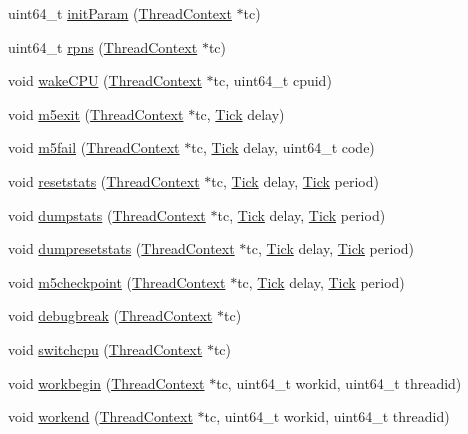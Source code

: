 \begin{DoxyCompactItemize}
\item 
uint64\_\-t \hyperlink{namespacePseudoInst_a9abf733144bf0f0e7b76fa3d7d18467b}{initParam} (\hyperlink{classThreadContext}{ThreadContext} $\ast$tc)
\item 
uint64\_\-t \hyperlink{namespacePseudoInst_a80a5aaed64e395721c05798e013e3eba}{rpns} (\hyperlink{classThreadContext}{ThreadContext} $\ast$tc)
\item 
void \hyperlink{namespacePseudoInst_a09f94700f81d851f029c37019d7dde05}{wakeCPU} (\hyperlink{classThreadContext}{ThreadContext} $\ast$tc, uint64\_\-t cpuid)
\item 
void \hyperlink{namespacePseudoInst_af78146b46bc73f7ec13ab69b3f6e5779}{m5exit} (\hyperlink{classThreadContext}{ThreadContext} $\ast$tc, \hyperlink{base_2types_8hh_a5c8ed81b7d238c9083e1037ba6d61643}{Tick} delay)
\item 
void \hyperlink{namespacePseudoInst_a651838ae3cd047fdc85bd84e3f2215fd}{m5fail} (\hyperlink{classThreadContext}{ThreadContext} $\ast$tc, \hyperlink{base_2types_8hh_a5c8ed81b7d238c9083e1037ba6d61643}{Tick} delay, uint64\_\-t code)
\item 
void \hyperlink{namespacePseudoInst_ac534c5c76b19579243916a2ab19064af}{resetstats} (\hyperlink{classThreadContext}{ThreadContext} $\ast$tc, \hyperlink{base_2types_8hh_a5c8ed81b7d238c9083e1037ba6d61643}{Tick} delay, \hyperlink{base_2types_8hh_a5c8ed81b7d238c9083e1037ba6d61643}{Tick} period)
\item 
void \hyperlink{namespacePseudoInst_a530073934a148e51b0274c3ebaa96f42}{dumpstats} (\hyperlink{classThreadContext}{ThreadContext} $\ast$tc, \hyperlink{base_2types_8hh_a5c8ed81b7d238c9083e1037ba6d61643}{Tick} delay, \hyperlink{base_2types_8hh_a5c8ed81b7d238c9083e1037ba6d61643}{Tick} period)
\item 
void \hyperlink{namespacePseudoInst_ac41c805ee58cc83abd878e49d9d9ff42}{dumpresetstats} (\hyperlink{classThreadContext}{ThreadContext} $\ast$tc, \hyperlink{base_2types_8hh_a5c8ed81b7d238c9083e1037ba6d61643}{Tick} delay, \hyperlink{base_2types_8hh_a5c8ed81b7d238c9083e1037ba6d61643}{Tick} period)
\item 
void \hyperlink{namespacePseudoInst_a276cb03befb21cde7ac21c6302533c01}{m5checkpoint} (\hyperlink{classThreadContext}{ThreadContext} $\ast$tc, \hyperlink{base_2types_8hh_a5c8ed81b7d238c9083e1037ba6d61643}{Tick} delay, \hyperlink{base_2types_8hh_a5c8ed81b7d238c9083e1037ba6d61643}{Tick} period)
\item 
void \hyperlink{namespacePseudoInst_a443ca28fda37e0c3211abfc3d41fd999}{debugbreak} (\hyperlink{classThreadContext}{ThreadContext} $\ast$tc)
\item 
void \hyperlink{namespacePseudoInst_aaf5643633dadf53cc203e80bd0b54ba6}{switchcpu} (\hyperlink{classThreadContext}{ThreadContext} $\ast$tc)
\item 
void \hyperlink{namespacePseudoInst_ac883da99bdbd438ad5d32a58f60769e9}{workbegin} (\hyperlink{classThreadContext}{ThreadContext} $\ast$tc, uint64\_\-t workid, uint64\_\-t threadid)
\item 
void \hyperlink{namespacePseudoInst_ad5ecc2000334e8354f226e01727824a0}{workend} (\hyperlink{classThreadContext}{ThreadContext} $\ast$tc, uint64\_\-t workid, uint64\_\-t threadid)
\end{DoxyCompactItemize}
